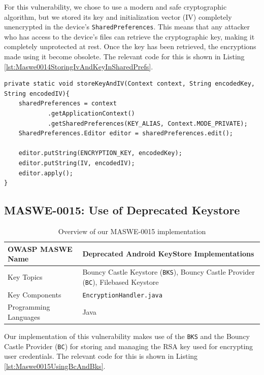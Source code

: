 For this vulnerability, we chose to use a modern and safe cryptographic algorithm, but we stored its key and initialization vector (IV) completely unencrypted in the device's \texttt{SharedPreferences}. This means that any attacker who has access to the device's files can retrieve the cryptographic key, making it completely unprotected at rest. Once the key has been retrieved, the encryptions made using it become obsolete. The relevant code for this is shown in Listing \ref{lst:Maswe0014StoringIvAndKeyInSharedPrefs}.

\begin{lstlisting}[style=JavaStyle, float=tbh, mathescape=true, captionpos=b, caption={Storing cryptographic key and initialization vector unencrypted in \texttt{Shared\linebreak[0]Preferences}}, label=lst:Maswe0014StoringIvAndKeyInSharedPrefs]
private static void storeKeyAndIV(Context context, String encodedKey, String encodedIV){
    sharedPreferences = context
            .getApplicationContext()
            .getSharedPreferences(KEY_ALIAS, Context.MODE_PRIVATE);
    SharedPreferences.Editor editor = sharedPreferences.edit();

    editor.putString(ENCRYPTION_KEY, encodedKey);
    editor.putString(IV, encodedIV);
    editor.apply();
}
\end{lstlisting}


\subsection{MASWE-0015: Use of Deprecated Keystore}
\label{subsec:maswe-0015}

\begin{table}[H]
\centering
\renewcommand{\arraystretch}{1.3}
\begin{tabular}{p{5cm} p{8cm}} 
\toprule
OWASP MASWE Name & Deprecated Android KeyStore Implementations \\ 
\midrule
Key Topics & Bouncy Castle Keystore (\texttt{BKS}), Bouncy Castle Provider (\texttt{BC}), Filebased Keystore \\
Key Components & \texttt{EncryptionHandler.java} \\
Programming Languages & Java \\ 
\bottomrule
\end{tabular}
\caption{Overview of our MASWE-0015 implementation}
\label{tab:maswe-0015}
\end{table}

Our implementation of this vulnerability makes use of the \texttt{BKS} and the Bouncy Castle Provider (\texttt{BC}) for storing and managing the RSA key used for encrypting user credentials. The relevant code for this is shown in Listing \ref{lst:Maswe0015UsingBcAndBks}.

